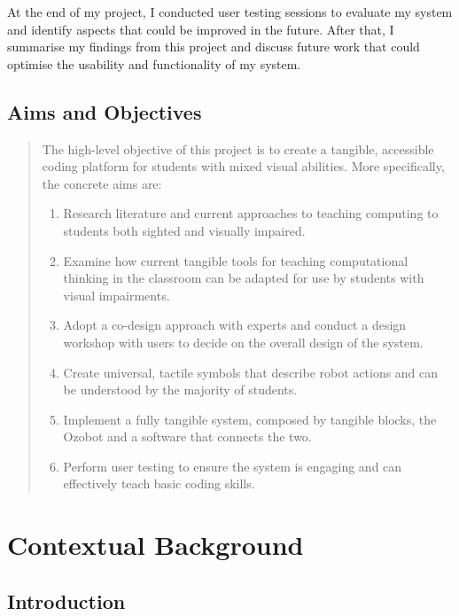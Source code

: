 \documentclass[oneside,%
                    author={Malak Hajji},
                    degree={BSc},
                    title={Designing An Accessible Ozobot Programming Platform for Students},
                  subtitle={With Mixed Visual Abilities}]{dissertation}
\begin{document}
At the end of my project, I conducted user testing sessions to evaluate my system and identify aspects that could be improved in the future. After that, I summarise my findings from this project and discuss future work that could optimise the usability and functionality of my system.

\section{Aims and Objectives}

\begin{quote}
\noindent
The high-level objective of this project is to create a tangible, accessible coding platform for students with mixed visual abilities. More specifically, the concrete aims are:

\begin{enumerate}
\item Research literature and current approaches to teaching computing to students both sighted and visually impaired.
\item Examine how current tangible tools for teaching computational thinking in the classroom can be adapted for use by students with visual impairments.
\item Adopt a co-design approach with experts and conduct a design workshop with users to decide on the overall design of the system.
\item Create universal, tactile symbols that describe robot actions and can be understood by the majority of students.
\item Implement a fully tangible system, composed by tangible blocks, the Ozobot and a software that connects the two.
\item Perform user testing to ensure the system is engaging and can effectively teach basic coding skills.
\end{enumerate}
\end{quote}



\chapter{Contextual Background}
\label{chap:context}

\section{Introduction}
\end{document}
